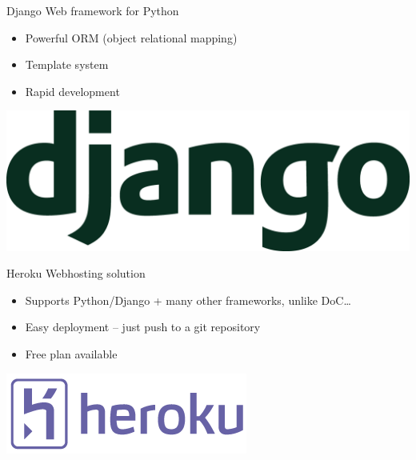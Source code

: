 \documentclass{beamer}
\begin{document}
\begin{frame}{Django}
  Web framework for Python \\
  \vspace{\baselineskip}
  \begin{itemize}
    \item Powerful ORM (object relational mapping)
    \vspace{\baselineskip}
    \item Template system
    \vspace{\baselineskip}
    \item Rapid development
  \end{itemize}
  \vspace{\baselineskip}
  \begin{center}
    \includegraphics[scale=0.05]{django.png} \\
  \end{center}
\end{frame}

\begin{frame}{Heroku}
  Webhosting solution \\
  \vspace{\baselineskip}
  \begin{itemize}
    \item Supports Python/Django + many other frameworks, unlike DoC\ldots
    \vspace{\baselineskip}
    \item Easy deployment -- just push to a git repository
    \vspace{\baselineskip}
    \item Free plan available
  \end{itemize}
  \vspace{\baselineskip}
  \begin{center}
    \includegraphics[scale=0.25]{heroku.png} \\
  \end{center}
\end{frame}
\end{document}
